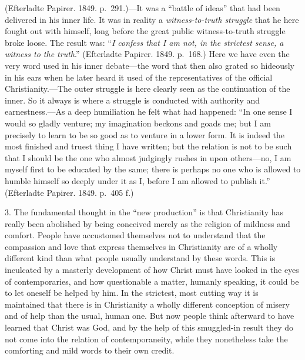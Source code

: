 \documentclass[12pt,a4paper]{book}
\newcommand{\opage}[1]{\marginnote{\footnotesize\textit{[#1]}}}
\begin{document}
(Efterladte
\opage{134}Papirer. 1849. p.~291.)---It was a ``battle of ideas'' that
had been delivered in his inner life. It was in reality a
\textit{witness-to-truth struggle} that he here fought out with himself,
long before the great public witness-to-truth struggle broke loose. The
result was: ``\textit{I confess that I am not, in the strictest sense, a
witness to the truth}.'' (Efterladte Papirer. 1849. p.~168.) Here we
have even the very word used in his inner debate---the word that then
also grated so hideously in his ears when he later heard it used of the
representatives of the official Christianity.---The outer struggle is
here clearly seen as the continuation of the inner. So it always is
where a struggle is conducted with authority and earnestness.---As a
deep humiliation he felt what had happened: ``In one sense I would so
gladly venture; my imagination beckons and goads me; but I am precisely
to learn to be so good as to venture in a lower form. It is indeed the
most finished and truest thing I have written; but the relation is not
to be such that I should be the one who almost judgingly rushes in upon
others---no, I am myself first to be educated by the same; there is
perhaps no one who is allowed to humble himself so deeply under it as I,
before I am allowed to publish it.'' (Efterladte Papirer. 1849.
p.~405 f.)

3. The fundamental thought in the ``new production'' is that
Christianity has really been abolished by being conceived merely as the
religion of mildness and comfort. People have accustomed themselves not
to understand that the compassion and love that express themselves in
Christianity are of a wholly different kind than what people usually
understand by these words. This is inculcated by a masterly development
of how Christ must have looked in the eyes of contemporaries, and how
questionable a matter, humanly speaking, it could be to let oneself be
helped by him. In the strictest, most cutting way it is maintained that
there is in
\opage{135}Christianity a wholly different conception of misery and of
help than the usual, human one. But now people think afterward to have
learned that Christ was God, and by the help of this smuggled-in result
they do not come into the relation of contemporaneity, while they
nonetheless take the comforting and mild words to their own credit.
\end{document}
